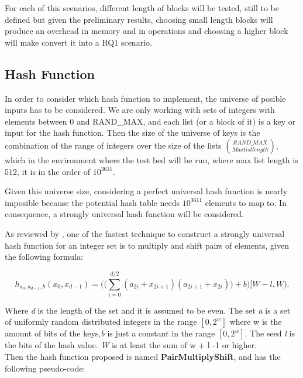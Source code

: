 \documentclass[a4paper,12pt]{article}
\begin{document}
For each of this scenarios, different length of blocks will be tested, still to be defined but given the preliminary results, choosing small length blocks will produce an overhead in memory and in operations and choosing a higher block will make convert it into a RQ1 scenario. \\


\subsection{Hash Function}

In order to consider which hash function to implement, the universe of posible inputs has to be considered. We are only working with sets of integers with elements between 0 and RAND\_MAX, and each list (or a block of it) is a key or input for the hash function. 
Then the size of the universe of keys is the combination of the range of integers over the size of the lists $\binom{RAND\_MAX}{Max list length} $, which in the environment where the test bed will be run, where max list length is 512, it is in the order of $10^{3611}$.

Given this universe size, considering a perfect universal hash function is nearly imposible because the potential hash table needs $10^{3611}$ elements to map to. In consequence, a strongly universal hash function will be considered.

As reviewed by \cite{thorup2015high}, one of the fastest technique to construct a strongly universal hash function for an integer set is to multiply and shift pairs of elements, given the following formula:

\begin{equation}
	h_{a_0,a_{d-1},b} (x_0, x_{d-1}) = \Bigg(\Bigg( \sum_{i=0}^{d/2} (a_{2i} + x_{2i+1})  (a_{2i+1} + x_{2i})\Bigg)  + b\Bigg) [W-l, W).
\end{equation}

Where {\it d}  is the length of the set and it is assumed to be even. The set {\it a} is a set of uniformly random distributed integers in the  range $[0,2^w]$ where w is the amount of bits of the keys,{\it b}  is just a constant in the range $[0,2^w]$. The seed {\it l}  is the bits of the hash value. {\it W}  is at least the sum of w + l -1 or higher. \\
Then the hash function proposed is named {\bf PairMultiplyShift}, and has the following pseudo-code:
\end{document}
